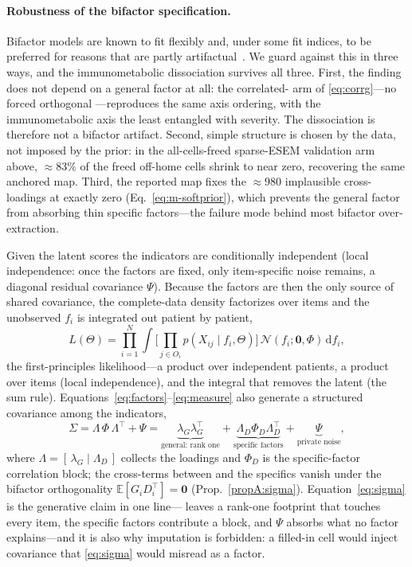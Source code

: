 \paragraph{Robustness of the bifactor specification.} Bifactor models are known to fit
flexibly and, under some fit indices, to be preferred for reasons that are partly
artifactual~\citep{bonifaycai2017,greene2019fit}. We guard against this in three ways,
and the immunometabolic dissociation survives all three. First, the finding does not depend on a general factor at all: the correlated-\Gfac{} arm of \eqref{eq:corrg}---no forced orthogonal \Gfac{}---reproduces the same axis ordering, with the immunometabolic axis the least entangled with severity. The dissociation is therefore not a bifactor artifact.
Second, simple structure is chosen by the data, not imposed by the prior: in the
all-cells-freed sparse-ESEM validation arm above, $\approx83\%$ of the freed off-home
cells shrink to near zero, recovering the same anchored map. Third, the reported map
fixes the $\approx980$ implausible cross-loadings at exactly zero (Eq.~\ref{eq:m-softprior}),
which prevents the general factor from absorbing thin specific factors---the failure
mode behind most bifactor over-extraction.

Given the latent scores the indicators are conditionally independent (local
independence: once the factors are fixed, only item-specific noise remains, a diagonal
residual covariance $\Psi$). Because the factors are then the only source of shared
covariance, the complete-data density factorizes over items and the unobserved $f_i$ is
integrated out patient by patient,
\begin{equation}
  L(\Theta)=\prod_{i=1}^{N}\int\Big[\textstyle\prod_{j\in O_i} p(X_{ij}\mid f_i,\Theta)\Big]\,
  \mathcal N(f_i;\mathbf 0,\Phi)\,\mathrm{d}f_i ,
  \label{eq:m-fulllik}
\end{equation}
the first-principles likelihood---a product over independent patients, a product over items
(local independence), and the integral that removes the latent (the sum rule).
Equations~\eqref{eq:factors}--\eqref{eq:measure} also generate a structured covariance among
the indicators,
\begin{equation}
  \Sigma=\Lambda\,\Phi\,\Lambda^{\top}+\Psi
        =\underbrace{\lambda_G\lambda_G^{\top}}_{\text{general: rank one}}
         +\underbrace{\Lambda_D\Phi_D\Lambda_D^{\top}}_{\text{specific factors}}
         +\underbrace{\Psi}_{\text{private noise}},
  \label{eq:sigma}
\end{equation}
where $\Lambda=[\,\lambda_G\mid\Lambda_D\,]$ collects the loadings and $\Phi_D$ is the
specific-factor correlation block; the cross-terms between \Gfac{} and the specifics vanish
under the bifactor orthogonality $\mathbb E[G_iD_i^{\top}]=\mathbf 0$
(Prop.~\ref{propA:sigma}). Equation~\eqref{eq:sigma} is the generative claim in one
line---\Gfac{} leaves a rank-one footprint that touches every item, the specific factors
contribute a block, and $\Psi$ absorbs what no factor explains---and it is also why imputation
is forbidden: a filled-in cell would inject covariance that \eqref{eq:sigma} would misread as
a factor.

